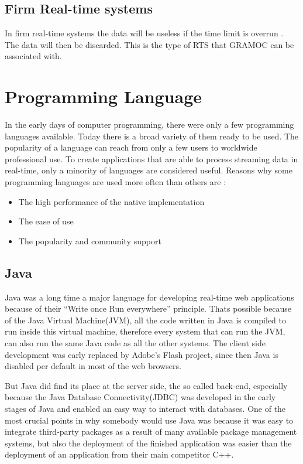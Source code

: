 \subsection{Firm Real-time systems}

In firm real-time systems the data will be useless if the time limit is overrun \autocite{RealTimeHermannKopetz}. The data will then be discarded. This is the type of RTS that GRAMOC can be associated with.

\author{Nico Leidenfrost}
%
\section{Programming Language}
In the early days of computer programming, there were only a few programming languages available. Today there is a broad variety of them ready to be used. The popularity of a language can reach from only a few users to worldwide professional use. To create applications that are able to process streaming data in real-time, only a minority of languages are considered useful. Reasons why some programming languages are used more often than others are \autocite{RealTimeByronEllis}:

\begin{itemize}
    \item The high performance of the native implementation
    \item The ease of use
    \item The popularity and community support
\end{itemize}

\subsection{Java}
Java was a long time a major language for developing real-time web applications because of their ``Write once Run everywhere'' principle. Thats possible because of the Java Virtual Machine(JVM), all the code written in Java is compiled to run inside this virtual machine, therefore every system that can run the JVM, can also run the same Java code as all the other systems. The client side development was early replaced by Adobe's Flash project, since then Java is disabled per default in most of the web browsers.

But Java did find its place at the server side, the so called back-end, especially because the Java Database Connectivity(JDBC) was developed in the early stages of Java and enabled an easy way to interact with databases. One of the most crucial points in why somebody would use Java was because it was easy to integrate third-party packages as a result of many available package management systems, but also the deployment of the finished application was easier than the deployment of an application from their main competitor C++.

